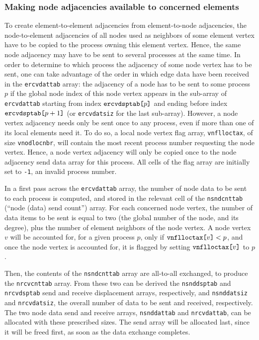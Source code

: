 \subsubsection{Making node adjacencies available to concerned elements}

To create element-to-element adjacencies from element-to-node
adjacencies, the node-to-element adjacencies of all nodes used as
neighbors of some element vertex have to be copied to the process
owning this element vertex. Hence, the same node adjacency may have to
be sent to several processes at the same time. In order to determine
to which process the adjacency of some node vertex has to be sent, one
can take advantage of the order in which edge data have been received
in the \texttt{ercv\lbt dat\lbt tab} array: the adjacency of a node
has to be sent to some process $p$ if the global node index of this node
vertex appears in the sub-array of \texttt{ercv\lbt dat\lbt tab}
starting from index $\texttt{ercv\lbt dsp\lbt tab[}p\texttt{]}$ and
ending before index $\texttt{ercv\lbt dsp\lbt tab[}p+1\texttt{]}$ (or
\texttt{ercv\lbt dat\lbt siz} for the last sub-array). However, a
node vertex adjacency needs only be sent once to any process, even if
more than one of its local elements need it. To do so, a local node
vertex flag array, \texttt{vnfl\lbt loc\lbt tax}, of size
\texttt{vnod\lbt loc\lbt nbr}, will contain the most recent process
number requesting the node vertex. Hence, a node vertex adjacency will
only be copied once to the node adjacency send data array for this
process. All cells of the flag array are initially set to \texttt{-1},
an invalid process number.

In a first pass across the \texttt{ercv\lbt dat\lbt tab} array, the
number of node data to be sent to each process is computed, and stored
in the relevant cell of the \texttt{nsnd\lbt cnt\lbt tab} (``node
(data) send count'') array. For each concerned node vertex, the number
of data items to be sent is equal to two (the global number of the
node, and its degree), plus the number of element neighbors of the
node vertex. A node vertex $v$ will be accounted for, for a given
process $p$, only if $\texttt{vnfl\lbt loc\lbt tax[}v\texttt{]} < p$,
and once the node vertex is accounted for, it is flagged by setting
$\texttt{vnfl\lbt loc\lbt tax[}v\texttt{]}$ to $p$.

Then, the contents of the \texttt{nsnd\lbt cnt\lbt tab} array are
all-to-all exchanged, to produce the \texttt{nrcv\lbt cnt\lbt tab}
array. From these two can be derived the \texttt{nsnd\lbt dsp\lbt tab}
and \texttt{nrcv\lbt dsp\lbt tab} send and receive displacement arrays,
respectively, and \texttt{nsnd\lbt dat\lbt siz} and
\texttt{nrcv\lbt dat\lbt siz}, the overall number of data to be sent
and received, respectively. The two node data send and receive arrays,
\texttt{nsnd\lbt dat\lbt tab} and \texttt{nrcv\lbt dat\lbt tab}, can be
allocated with these prescribed sizes. The send array will be
allocated last, since it will be freed first, as soon as the
data exchange completes.

